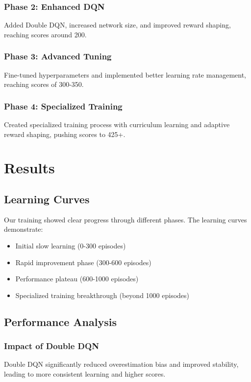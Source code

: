 \documentclass[11pt,a4paper]{article}
\begin{document}
\subsubsection{Phase 2: Enhanced DQN}
Added Double DQN, increased network size, and improved reward shaping, reaching scores around 200.

\subsubsection{Phase 3: Advanced Tuning}
Fine-tuned hyperparameters and implemented better learning rate management, reaching scores of 300-350.

\subsubsection{Phase 4: Specialized Training}
Created specialized training process with curriculum learning and adaptive reward shaping, pushing scores to 425+.

\section{Results}

\subsection{Learning Curves}

Our training showed clear progress through different phases. The learning curves demonstrate:

\begin{itemize}
    \item Initial slow learning (0-300 episodes)
    \item Rapid improvement phase (300-600 episodes)
    \item Performance plateau (600-1000 episodes)
    \item Specialized training breakthrough (beyond 1000 episodes)
\end{itemize}

\subsection{Performance Analysis}

\subsubsection{Impact of Double DQN}
Double DQN significantly reduced overestimation bias and improved stability, leading to more consistent learning and higher scores.
\end{document}
